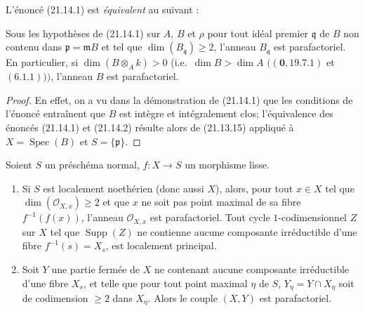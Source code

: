 L'énoncé (21.14.1) est \emph{équivalent} au suivant :

\begin{corollary}[21.14.2]
\label{IV.21.14.2}
Sous les hypothèses de \textup{(21.14.1)} sur $A$, $B$ et $\rho$ pour tout idéal premier
$\mathfrak q$ de $B$ non contenu dans $\mathfrak p=\mathfrak mB$ et tel que
$\dim(B_\mathfrak q)\geq2$, l'anneau $B_\mathfrak q$ est parafactoriel. En
particulier, si $\dim(B\otimes_A k)>0$ \textup{(}i.e.\ $\dim B>\dim A$
$((\mathbf 0, 19.7.1)$ et $(6.1.1)))$, l'anneau $B$ est parafactoriel.
\end{corollary}

\begin{proof}
En effet, on a vu dans la démonstration de (21.14.1) que les conditions de l'énoncé
entraînent que $B$ est intègre et intégralement clos; l'équivalence des énoncés
(21.14.1) et (21.14.2) résulte alors de (21.13.15) appliqué à
$X=\operatorname{Spec}(B)$ et $S=\{\mathfrak p\}$.
\end{proof}

\begin{proposition}[21.14.3]
\label{IV.21.14.3}
Soient $S$ un préschéma normal, $f:X\to S$ un morphisme lisse.
\begin{enumerate}[label=\textup{(\roman*)}]
  \item Si $S$ est localement noethérien \textup{(}donc aussi $X$\textup{)}, alors, pour tout $x\in X$
  tel que $\dim(\mathcal O_{X,x})\geq2$ et que $x$ ne soit pas point maximal de sa
  fibre $f^{-1}(f(x))$, l'anneau $\mathcal O_{X,x}$ est parafactoriel. Tout cycle
  $1$-codimensionnel $Z$ sur $X$ tel que $\operatorname{Supp}(Z)$ ne contienne aucune
  composante irréductible d'une fibre $f^{-1}(s)=X_s$, est localement principal.
  \item Soit $Y$ une partie fermée de $X$ ne contenant aucune composante irréductible
  d'une fibre $X_s$, et telle que pour tout point maximal $\eta$ de $S$,
  $Y_\eta=Y\cap X_\eta$ soit de codimension $\geq2$ dans $X_\eta$. Alors le couple
  $(X,Y)$ est parafactoriel.
\end{enumerate}
\end{proposition}

